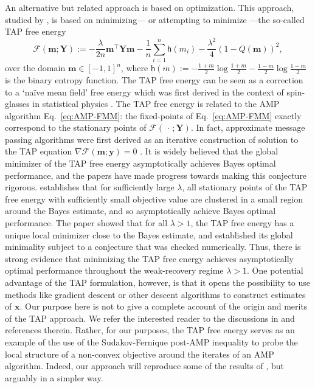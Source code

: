 \documentclass[]{article}
\def\bx{{\boldsymbol x}}
\def\by{{\boldsymbol y}}
\def\cF{{\mathcal F}}
\def\bx{{\boldsymbol x}}
\def\by{{\boldsymbol y}}
\def\cF{{\mathcal F}}
\def\bY{{\boldsymbol Y}}
\def\bbm{{\boldsymbol m}}
\def\sh{{\mathsf h}}
\begin{document}
An alternative but related approach is based on optimization.
This approach, 
studied by \cite{fanMeiMontanari2021,celentanoFanMei2021},
is based on minimizing--- or attempting to minimize ---the so-called TAP free energy
\begin{equation}
\label{eq:TAP-1}
    \cF(\bbm;\bY)   
        := 
        - \frac{\lambda}{2n} \bbm^\top \bY \bbm
        - \frac1n \sum_{i=1}^n \sh(m_i) 
        - \frac{\lambda^2}{4}(1 - Q(\bbm))^2,
\end{equation}
over the domain $\bbm \in [-1,1]^n$,
where $\sh(m) := -\frac{1+m}{2}\log \frac{1+m}2 - \frac{1-m}{2} \log \frac{1-m}2$ is the binary entropy function. 
The TAP free energy can be seen as a correction to a `na\"ive mean field' free energy which was first derived in the context of spin-glasses in statistical physics \cite{thouless1977}.
The TAP free energy is related to the AMP algorithm Eq.~\eqref{eq:AMP-FMM}:
the fixed-points of Eq.~\eqref{eq:AMP-FMM} 
exactly correspond to the stationary points of $\cF(\,\cdot\,;\bY)$.
In fact, approximate message passing algorithms were first derived as an iterative construction of solution to the TAP equation $\nabla \cF(\bbm;\by) = 0$ \cite{Bolthausen2014}.
It is widely believed that the global minimizer of the TAP free energy asymptotically achieves Bayes optimal performance,
and the papers \cite{fanMeiMontanari2021,celentanoFanMei2021} have made progress towards making this conjecture rigorous.
\cite{fanMeiMontanari2021} establishes that for sufficiently large $\lambda$,
all stationary points of the TAP free energy with sufficiently small objective value are clustered in a small region around the Bayes estimate, and so asymptotically achieve Bayes optimal performance.
The paper \cite{celentanoFanMei2021} showed that for all $\lambda > 1$, 
the TAP free energy has a unique local minimizer close to the Bayes estimate, 
and established its global minimality subject to a conjecture that was checked numerically. 
Thus, 
there is strong evidence that minimizing the TAP free energy achieves asymptotically optimal performance throughout the weak-recovery regime $\lambda > 1$. 
One potential advantage of the TAP formulation, however, is that it opens the possibility to use methods like gradient descent or other descent algorithms to construct estimates of $\bx$. 
Our purpose here is not to give a complete account of the origin and merits of the TAP approach.
We refer the interested reader to the discussions in \cite{thouless1977,mezard1987spin,fanMeiMontanari2021,celentanoFanMei2021} and references therein.
Rather, for our purposes, 
the TAP free energy serves as an example of the use of the Sudakov-Fernique post-AMP inequality to probe the local structure of a non-convex objective around the iterates of an AMP algorithm. 
Indeed, our approach will reproduce some of the results of \cite{celentanoFanMei2021}, but arguably in a simpler way.
\end{document}
